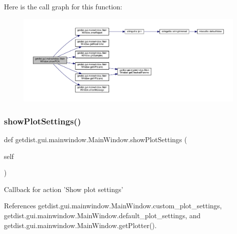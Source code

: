 Here is the call graph for this function\+:
\nopagebreak
\begin{figure}[H]
\begin{center}
\leavevmode
\includegraphics[width=350pt]{classgetdist_1_1gui_1_1mainwindow_1_1MainWindow_a2ce9349444008527443bc8891a5b8a44_cgraph}
\end{center}
\end{figure}
\mbox{\label{classgetdist_1_1gui_1_1mainwindow_1_1MainWindow_aad177b33d62234497a50dea1e81f5401}} 
\subsubsection{\texorpdfstring{show\+Plot\+Settings()}{showPlotSettings()}}
{\footnotesize\ttfamily def getdist.\+gui.\+mainwindow.\+Main\+Window.\+show\+Plot\+Settings (\begin{DoxyParamCaption}\item[{}]{self }\end{DoxyParamCaption})}

\begin{DoxyVerb}Callback for action 'Show plot settings'
\end{DoxyVerb}
 

References getdist.\+gui.\+mainwindow.\+Main\+Window.\+custom\+\_\+plot\+\_\+settings, getdist.\+gui.\+mainwindow.\+Main\+Window.\+default\+\_\+plot\+\_\+settings, and getdist.\+gui.\+mainwindow.\+Main\+Window.\+get\+Plotter().

